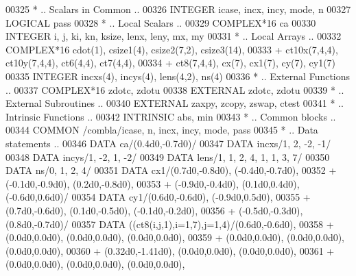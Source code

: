 \begin{DoxyCode}
00325 \textcolor{comment}{*     .. Scalars in Common ..}
00326       \textcolor{keywordtype}{INTEGER}           icase, incx, incy, mode, n
00327       \textcolor{keywordtype}{LOGICAL}           pass
00328 \textcolor{comment}{*     .. Local Scalars ..}
00329       \textcolor{keywordtype}{COMPLEX*16}        ca
00330       \textcolor{keywordtype}{INTEGER}           i, j, ki, kn, ksize, lenx, leny, mx, my
00331 \textcolor{comment}{*     .. Local Arrays ..}
00332       \textcolor{keywordtype}{COMPLEX*16}        cdot(1), csize1(4), csize2(7,2), csize3(14),
00333      +                  ct10x(7,4,4), ct10y(7,4,4), ct6(4,4), ct7(4,4),
00334      +                  ct8(7,4,4), cx(7), cx1(7), cy(7), cy1(7)
00335       \textcolor{keywordtype}{INTEGER}           incxs(4), incys(4), lens(4,2), ns(4)
00336 \textcolor{comment}{*     .. External Functions ..}
00337       \textcolor{keywordtype}{COMPLEX*16}        zdotc, zdotu
00338       \textcolor{keywordtype}{EXTERNAL}          zdotc, zdotu
00339 \textcolor{comment}{*     .. External Subroutines ..}
00340       \textcolor{keywordtype}{EXTERNAL}          zaxpy, zcopy, zswap, ctest
00341 \textcolor{comment}{*     .. Intrinsic Functions ..}
00342       \textcolor{keywordtype}{INTRINSIC}         abs, min
00343 \textcolor{comment}{*     .. Common blocks ..}
00344       \textcolor{keyword}{COMMON}            /combla/icase, n, incx, incy, mode, pass
00345 \textcolor{comment}{*     .. Data statements ..}
00346       \textcolor{keyword}{DATA}              ca/(0.4d0,-0.7d0)/
00347       \textcolor{keyword}{DATA}              incxs/1, 2, -2, -1/
00348       \textcolor{keyword}{DATA}              incys/1, -2, 1, -2/
00349       \textcolor{keyword}{DATA}              lens/1, 1, 2, 4, 1, 1, 3, 7/
00350       \textcolor{keyword}{DATA}              ns/0, 1, 2, 4/
00351       \textcolor{keyword}{DATA}              cx1/(0.7d0,-0.8d0), (-0.4d0,-0.7d0),
00352      +                  (-0.1d0,-0.9d0), (0.2d0,-0.8d0),
00353      +                  (-0.9d0,-0.4d0), (0.1d0,0.4d0), (-0.6d0,0.6d0)/
00354       \textcolor{keyword}{DATA}              cy1/(0.6d0,-0.6d0), (-0.9d0,0.5d0),
00355      +                  (0.7d0,-0.6d0), (0.1d0,-0.5d0), (-0.1d0,-0.2d0),
00356      +                  (-0.5d0,-0.3d0), (0.8d0,-0.7d0)/
00357       \textcolor{keyword}{DATA}              ((ct8(i,j,1),i=1,7),j=1,4)/(0.6d0,-0.6d0),
00358      +                  (0.0d0,0.0d0), (0.0d0,0.0d0), (0.0d0,0.0d0),
00359      +                  (0.0d0,0.0d0), (0.0d0,0.0d0), (0.0d0,0.0d0),
00360      +                  (0.32d0,-1.41d0), (0.0d0,0.0d0), (0.0d0,0.0d0),
00361      +                  (0.0d0,0.0d0), (0.0d0,0.0d0), (0.0d0,0.0d0),

\end{DoxyCode}
